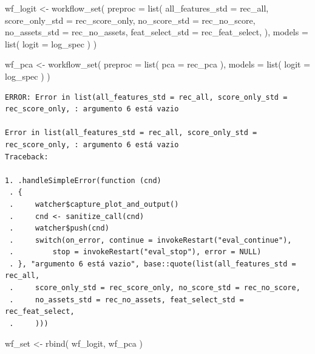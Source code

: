 \documentclass[
  letterpaper,
  DIV=11,
  numbers=noendperiod]{scrartcl}
\newenvironment{Shaded}{\begin{snugshade}}{\end{snugshade}}
\newcommand{\AttributeTok}[1]{\textcolor[rgb]{0.40,0.45,0.13}{#1}}
\newcommand{\FunctionTok}[1]{\textcolor[rgb]{0.28,0.35,0.67}{#1}}
\newcommand{\NormalTok}[1]{\textcolor[rgb]{0.00,0.23,0.31}{#1}}
\newcommand{\OtherTok}[1]{\textcolor[rgb]{0.00,0.23,0.31}{#1}}
\begin{document}
\begin{Shaded}
\begin{Highlighting}[]
\NormalTok{wf\_logit }\OtherTok{\textless{}{-}} \FunctionTok{workflow\_set}\NormalTok{(}
  \AttributeTok{preproc =} \FunctionTok{list}\NormalTok{(}
    \AttributeTok{all\_features\_std =}\NormalTok{ rec\_all,}
    \AttributeTok{score\_only\_std   =}\NormalTok{ rec\_score\_only,}
    \AttributeTok{no\_score\_std     =}\NormalTok{ rec\_no\_score,}
    \AttributeTok{no\_assets\_std    =}\NormalTok{ rec\_no\_assets,}
    \AttributeTok{feat\_select\_std  =}\NormalTok{ rec\_feat\_select,}
\NormalTok{  ),}
  \AttributeTok{models =} \FunctionTok{list}\NormalTok{(}
    \AttributeTok{logit =}\NormalTok{ log\_spec}
\NormalTok{  )}
\NormalTok{)}


\NormalTok{wf\_pca }\OtherTok{\textless{}{-}} \FunctionTok{workflow\_set}\NormalTok{(}
  \AttributeTok{preproc =} \FunctionTok{list}\NormalTok{(}
    \AttributeTok{pca =}\NormalTok{ rec\_pca}
\NormalTok{  ),}
  \AttributeTok{models =} \FunctionTok{list}\NormalTok{(}
    \AttributeTok{logit =}\NormalTok{ log\_spec}
\NormalTok{  )}
\NormalTok{)}
\end{Highlighting}
\end{Shaded}

\begin{verbatim}
ERROR: Error in list(all_features_std = rec_all, score_only_std = rec_score_only, : argumento 6 está vazio

Error in list(all_features_std = rec_all, score_only_std = rec_score_only, : argumento 6 está vazio
Traceback:

1. .handleSimpleError(function (cnd) 
 . {
 .     watcher$capture_plot_and_output()
 .     cnd <- sanitize_call(cnd)
 .     watcher$push(cnd)
 .     switch(on_error, continue = invokeRestart("eval_continue"), 
 .         stop = invokeRestart("eval_stop"), error = NULL)
 . }, "argumento 6 está vazio", base::quote(list(all_features_std = rec_all, 
 .     score_only_std = rec_score_only, no_score_std = rec_no_score, 
 .     no_assets_std = rec_no_assets, feat_select_std = rec_feat_select, 
 .     )))
\end{verbatim}

\begin{Shaded}
\begin{Highlighting}[]
\NormalTok{wf\_set }\OtherTok{\textless{}{-}} \FunctionTok{rbind}\NormalTok{(}
\NormalTok{  wf\_logit,}
\NormalTok{  wf\_pca}
\NormalTok{)}
\end{Highlighting}
\end{Shaded}
\end{document}
